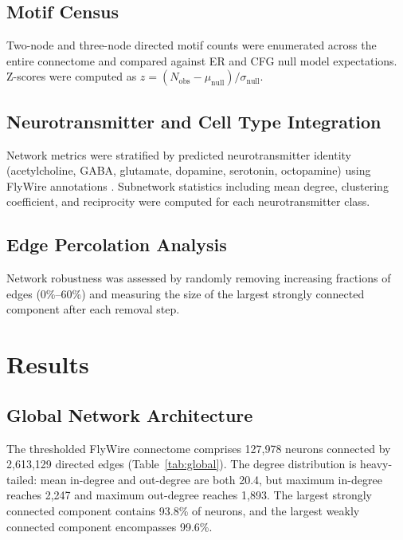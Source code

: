 \documentclass[11pt]{article}
\begin{document}
\subsection{Motif Census}

Two-node and three-node directed motif counts were enumerated across the entire connectome and compared against ER and CFG null model expectations. Z-scores were computed as $z = (N_{\text{obs}} - \mu_{\text{null}}) / \sigma_{\text{null}}$.

\subsection{Neurotransmitter and Cell Type Integration}

Network metrics were stratified by predicted neurotransmitter identity (acetylcholine, GABA, glutamate, dopamine, serotonin, octopamine) using FlyWire annotations \citep{eckstein2024neurotransmitter}. Subnetwork statistics including mean degree, clustering coefficient, and reciprocity were computed for each neurotransmitter class.

\subsection{Edge Percolation Analysis}

Network robustness was assessed by randomly removing increasing fractions of edges (0\%--60\%) and measuring the size of the largest strongly connected component after each removal step.

\section{Results}

\subsection{Global Network Architecture}

The thresholded FlyWire connectome comprises 127,978 neurons connected by 2,613,129 directed edges (Table~\ref{tab:global}). The degree distribution is heavy-tailed: mean in-degree and out-degree are both 20.4, but maximum in-degree reaches 2,247 and maximum out-degree reaches 1,893. The largest strongly connected component contains 93.8\% of neurons, and the largest weakly connected component encompasses 99.6\%.
\end{document}

